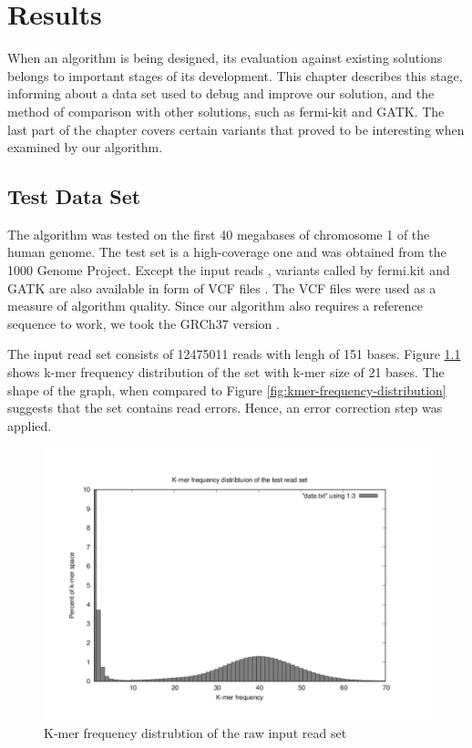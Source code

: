 \chapter{Results}
\label{chap:results}

When an algorithm is being designed, its evaluation against existing solutions belongs to important stages of its development. This chapter describes this stage, informing about a data set used to debug and improve our solution, and the method of comparison with other solutions, such as fermi-kit and GATK. The last part of the chapter covers certain variants that proved to be interesting when examined by our algorithm.

\section{Test Data Set}
\label{sec:test-data-set}

The algorithm was tested on the first 40 megabases of chromosome 1 of the human genome. The test set is a high-coverage one and was obtained from the 1000 Genome Project. Except the input reads \cite{testreads}, variants called by fermi.kit and GATK are also available in form of VCF files \cite{testvcf}. The VCF files were used as a measure of algorithm quality. Since our algorithm also requires a reference sequence to work, we took the GRCh37 version \cite{testref}.

The input read set consists of 12475011 reads with lengh of 151 bases. Figure \ref{fig:test-kmer-frequency-distribution} shows k-mer frequency distribution of the set with k-mer size of 21 bases. The shape of the graph, when compared to Figure \ref{fig:kmer-frequency-distribution} suggests that the set contains read errors. Hence, an error correction step was applied.

\begin{figure}[h]
\centering
\includegraphics{img/test-kmer-frequency-distribution.pdf}
\caption{K-mer frequency distrubtion of the raw input read set}
\label{fig:test-kmer-frequency-distribution}
\end{figure}


